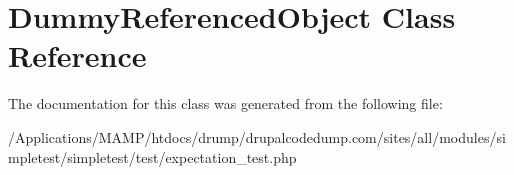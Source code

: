 \hypertarget{class_dummy_referenced_object}{
\section{DummyReferencedObject Class Reference}
\label{class_dummy_referenced_object}
}


The documentation for this class was generated from the following file:\begin{DoxyCompactItemize}
\item 
/Applications/MAMP/htdocs/drump/drupalcodedump.com/sites/all/modules/simpletest/simpletest/test/expectation\_\-test.php\end{DoxyCompactItemize}
